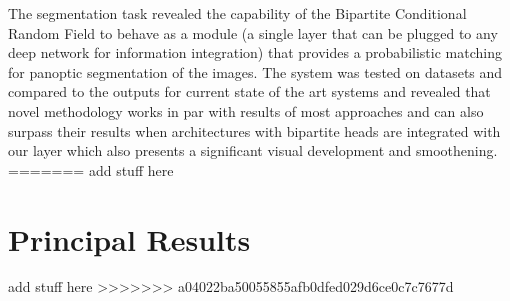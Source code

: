 The segmentation task revealed the capability of the Bipartite Conditional Random Field to behave as a module (a single layer that can be plugged to any deep network for information integration) that provides a probabilistic matching for panoptic segmentation of the images. The system was tested on datasets and compared to the outputs for current state of the art systems and revealed that novel methodology works in par with results of most approaches and can also surpass their results when architectures with bipartite heads are integrated with our layer which also presents a significant visual development and smoothening.  
=======
add stuff here
\section{Principal Results}
add stuff here
>>>>>>> a04022ba50055855afb0dfed029d6ce0c7c7677d

